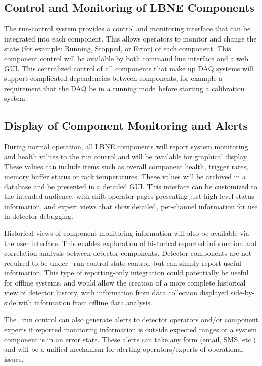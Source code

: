 \subsection{Control and Monitoring of LBNE Components}

The run-control system provides a control and monitoring
interface that can be integrated into each component.  This allows
operators to monitor and change the state (for example: Running,
Stopped, or Error) of each component.  This component control will be
available by both command line interface and a web GUI.%
This centralized control of all components that make up
DAQ systems will support complicated dependencies between components,
for example a requirement that the DAQ be in a running mode before
starting a calibration system.

\subsection{Display of Component Monitoring and Alerts}

During normal operation, all LBNE components will report system
monitoring and health values to the run control and will be
available for graphical display.  These values can include items such
as overall component health, trigger rates, memory buffer status or
rack temperatures.  These values will be archived in a database and be
presented in a detailed GUI.  This interface can
be customized to the intended audience, with shift operator pages
presenting just high-level status information, and expert views that
show detailed, per-channel information for use in detector debugging.

Historical views of component monitoring information will also be
available via the user interface.  This enables exploration of
historical reported information and correlation analysis between
detector components.  Detector components are not required to be under
\LBNE\ run-control-state control, but can simply report useful
information.  This type of reporting-only integration could
potentially be useful for offline systems, and would allow the
creation of a more complete historical view of detector history, with
information from data collection displayed side-by-side with
information from offline data analysis.

The \LBNE\ run control can also generate alerts to detector
operators and/or component experts if reported monitoring information
is outside expected ranges or a system component is in an error state.
These alerts can take any form (email, SMS, etc.) and will be a unified
mechanism for alerting operators/experts of operational issues.

